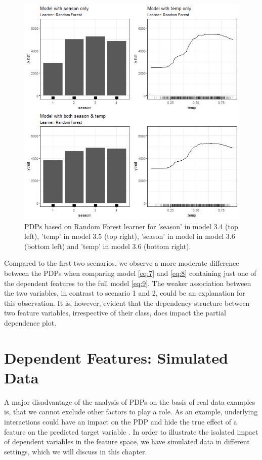 \documentclass[]{krantz}
\begin{document}
\begin{figure}

{\centering \includegraphics[width=0.8\linewidth]{images/VK_PDP_13_Correlated_cat_num_RF} 

}

\caption{PDPs based on Random Forest learner for 'season' in model 3.4 (top left), 'temp' in model 3.5 (top right), 'season' in model in model 3.6 (bottom left) and 'temp' in model 3.6 (bottom right).}\label{fig:Figure13}
\end{figure}

Compared to the first two scenarios, we observe a more moderate
difference between the PDPs when comparing model \eqref{eq:7} and
\eqref{eq:8} containing just one of the dependent features to the full
model \eqref{eq:9}. The weaker association between the two variables, in
contrast to scenario 1 and 2, could be an explanation for this
observation. It is, however, evident that the dependency structure
between two feature variables, irrespective of their class, does impact
the partial dependence plot.

\section{Dependent Features: Simulated Data}\label{SimulatedData}

A major disadvantage of the analysis of PDPs on the basis of real data
examples is, that we cannot exclude other factors to play a role. As an
example, underlying interactions could have an impact on the PDP and
hide the true effect of a feature on the predicted target variable
\citep{molnar2019}. In order to illustrate the isolated impact of
dependent variables in the feature space, we have simulated data in
different settings, which we will discuss in this chapter.
\end{document}
